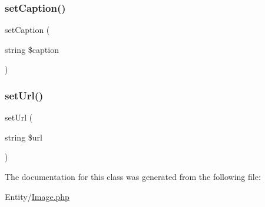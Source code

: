 \mbox{\label{class_app_1_1_entity_1_1_image_a8ad36f0a16f0ec6168ceba7bac6a3cc4}} 
\subsubsection{\texorpdfstring{setCaption()}{setCaption()}}
{\footnotesize\ttfamily set\+Caption (\begin{DoxyParamCaption}\item[{string}]{\$caption }\end{DoxyParamCaption})}

\mbox{\label{class_app_1_1_entity_1_1_image_ad890855a744bb83f100ae399bab0579e}} 
\subsubsection{\texorpdfstring{setUrl()}{setUrl()}}
{\footnotesize\ttfamily set\+Url (\begin{DoxyParamCaption}\item[{string}]{\$url }\end{DoxyParamCaption})}



The documentation for this class was generated from the following file\+:\begin{DoxyCompactItemize}
\item 
Entity/\mbox{\hyperlink{_image_8php}{Image.\+php}}\end{DoxyCompactItemize}
